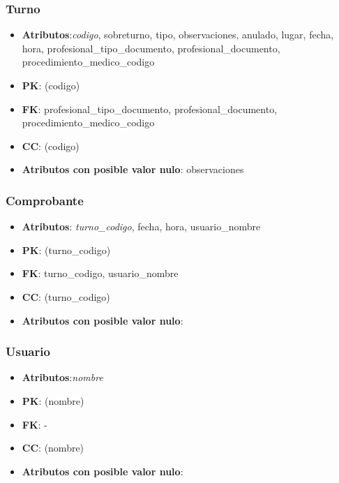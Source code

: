 \documentclass[a4paper,11pt]{article}
\begin{document}
\subsubsection{\textbf{Turno}}

\begin{itemize}

\item 
\textbf{Atributos}:\emph{codigo}, sobreturno, tipo, observaciones, anulado, lugar, fecha, hora, profesional\_tipo\_documento, profesional\_documento, procedimiento\_medico\_codigo

\item 
\textbf{PK}: (codigo)

\item
\textbf{FK}: profesional\_tipo\_documento, profesional\_documento, procedimiento\_medico\_codigo

\item 
\textbf{CC}: (codigo)

\item 
\textbf{Atributos con posible valor nulo}: observaciones

\end{itemize}
\subsubsection{\textbf{Comprobante}}

\begin{itemize}

\item 
\textbf{Atributos}: \emph{turno\_codigo}, fecha, hora, usuario\_nombre

\item 
\textbf{PK}: (turno\_codigo)

\item
\textbf{FK}: turno\_codigo, usuario\_nombre

\item 
\textbf{CC}: (turno\_codigo)

\item 
\textbf{Atributos con posible valor nulo}: 

\end{itemize}
\subsubsection{\textbf{Usuario}}

\begin{itemize}

\item 
\textbf{Atributos}:\emph{nombre}

\item 
\textbf{PK}: (nombre)

\item
\textbf{FK}: - 

\item 
\textbf{CC}: (nombre)

\item 
\textbf{Atributos con posible valor nulo}: 
\end{itemize}
\end{document}
